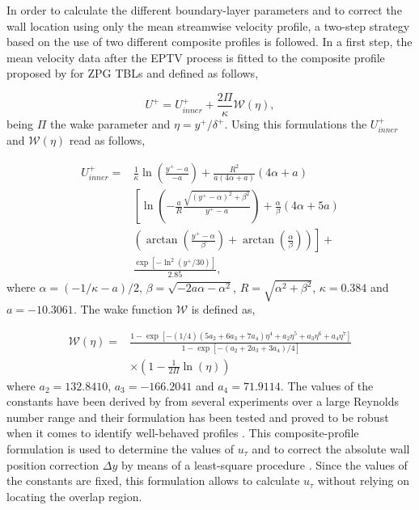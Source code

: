 In order to calculate the different boundary-layer parameters and to correct the wall location using only the mean streamwise velocity profile, a two-step strategy based on the use of two different composite profiles is followed. In a first step, the mean velocity data after the EPTV process is fitted to the composite profile proposed by \citet{Chauhan:2009p10824} {for ZPG TBLs }and defined as follows,

\begin{equation} \label{eq:chauhan}
U^+=U^+_{inner}+\frac{2\Pi}{\kappa} \mathcal{W} \left( \eta \right), 
\end{equation}
being $\Pi$ the wake parameter and $\eta=y^+/\delta^+$. Using this formulations the $U^+_{inner}$ and $\mathcal{W}\left(\eta \right)$ read as follows,

\begin{equation}
\label{innerchuahan}
\begin{array}{ll}
U^+_{inner}=& \frac{1}{\kappa} \ln\left(\frac{y^+-a}{-a}\right)  + \frac{R^2}{a(4\alpha+a)} 
 (4\alpha+a)  \\
& \left[ \ln \left(-\frac{a}{R}\frac{\sqrt{(y^+ -\alpha)^2+\beta^2}}{y^+-a}\right) +\frac{\alpha}{\beta}(4\alpha+5a) \right. \\
& \left. \left(\arctan\left(\frac{y^+-\alpha}{\beta}\right)+\arctan\left(\frac{\alpha}{\beta}\right)\right) \right]+ \\ &\frac{\exp[-\ln^2(y^+/30)]}{2.85},
\end{array}
\end{equation} 
where $\alpha=(-1/\kappa-a)/2$, $\beta=\sqrt{-2a\alpha-\alpha^2}$, $R=\sqrt{\alpha^2+\beta^2}$, $\kappa=0.384$ and $a=-10.3061$. The wake function $\mathcal{W}$ is defined as,

\begin{equation}
\label{outerchauhan}
\begin{array}{ll}
\mathcal{W}(\eta)= & \frac{1-\exp\left[-(1/4)(5a_2+6a_3+7a_4)\eta^4+a_2\eta^5 +a_3\eta^6+a_4\eta^7
	\right]}{1-\exp[-(a_2+2a_3+3a_4)/4]}  \\
& \times \left(1-\frac{1}{2\Pi}\ln(\eta)\right) 
\end{array}
\end{equation} 
where $a_2=132.8410$, $a_3=-166.2041$ and $a_4=71.9114$. The values of the constants have been derived by \citet{Chauhan:2009p10824} from several experiments over a large Reynolds number range and their formulation has been tested and proved to be robust when it comes to identify well-behaved profiles  \citep{Chauhan:2009p10824}. This composite-profile formulation is used to determine the values of $u_\tau$ and to correct the absolute wall position correction $\Delta y $ by means of a least-square procedure \citep{Chauhan:2009p10824,Orlu:2010p36071,Rodriguez-Lopez2015}. Since the values of the constants are fixed, this formulation allows to calculate $u_\tau$ without relying on locating the overlap region.

